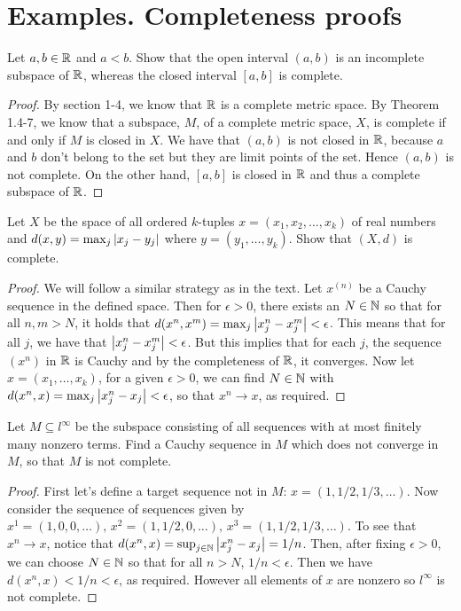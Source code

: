 \section{Examples. Completeness proofs}


\begin{exercise}{1}
Let $a,b\in\mathbb{R}$ and $a<b$. Show that the open interval $(a,b)$ is an incomplete subspace of $\mathbb{R}$, whereas the closed interval $[a,b]$ is complete.
\end{exercise}
\begin{proof}
By section 1-4, we know that $\mathbb{R}$ is a complete metric space. By Theorem 1.4-7, we know that a subspace, $M$, of a complete metric space, $X$, is complete if and only if $M$ is closed in $X$. We have that $(a,b)$ is not closed in $\mathbb{R}$, because $a$ and $b$ don't belong to the set but they are limit points of the set. Hence $(a,b)$ is not complete. On the other hand, $[a,b]$ is closed in $\mathbb{R}$ and thus a complete subspace of $\mathbb{R}$.
\end{proof}

\begin{exercise}{2}
Let $X$ be the space of all ordered $k$-tuples $x=(x_1,x_2,\dots,x_k)$ of real numbers and $d(x,y)=\max_j\left\lvert x_j-y_j\right\rvert$ where $y=(y_1,\dots,y_k)$. Show that $(X,d)$ is complete.
\end{exercise}
\begin{proof}
We will follow a similar strategy as in the text. Let $x^{(n)}$ be a Cauchy sequence in the defined space. Then for $\epsilon>0$, there exists an $N\in\mathbb{N}$ so that for all $n,m>N$, it holds that $d(x^n,x^m)=\max_j\left\lvert x^n_j-x^m_j\right\rvert<\epsilon$. This means that for all $j$, we have that $\left\lvert x^n_j-x^m_j\right\rvert<\epsilon$. But this implies that for each $j$, the sequence $(x^n)$ in $\mathbb{R}$ is Cauchy and by the completeness of $\mathbb{R}$, it converges. Now let $x=(x_1,\dots,x_k)$, for a given $\epsilon>0$, we can find $N\in\mathbb{N}$ with $d(x^n,x)=\max_j\left\lvert x^n_j-x_j\right\rvert<\epsilon$, so that $x^n\to x$, as required. 
\end{proof}

\begin{exercise}{3}
Let $M\subseteq l^\infty$ be the subspace consisting of all sequences with at most finitely many nonzero terms. Find a Cauchy sequence in $M$ which does not converge in $M$, so that $M$ is not complete.
\end{exercise}
\begin{proof}
First let's define a target sequence not in $M$: $x=(1,1/2,1/3,\dots)$. Now consider the sequence of sequences given by $x^1=(1,0,0,\dots),\,x^2=(1,1/2,0,\dots),\,x^3=(1,1/2,1/3,\dots)$. To see that $x^n\to x$, notice that $d(x^n,x)=\sup_{j\in\mathbb{N}}\left\lvert x^n_j-x_j\right\rvert=1/n$. Then, after fixing $\epsilon>0$, we can choose $N\in\mathbb{N}$ so that for all $n>N$, $1/n<\epsilon$. Then we have $d(x^n,x)<1/n<\epsilon$, as required. However all elements of $x$ are nonzero so $l^\infty$ is not complete.
\end{proof}

